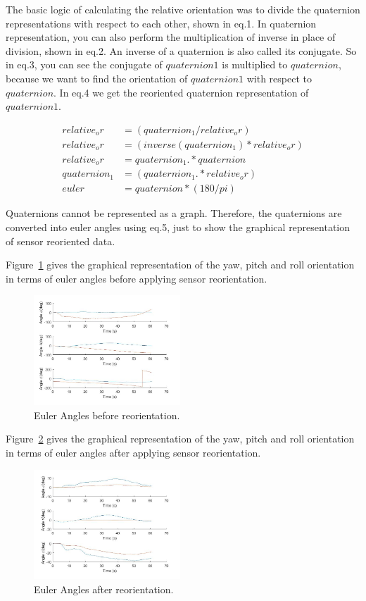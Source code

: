 \documentclass[journal]{IEEEtranTIE}
\begin{document}
The basic logic of calculating the relative orientation was to divide the
quaternion representations with respect to each other, shown in eq.1. In
quaternion representation, you can also perform the multiplication of inverse in
place of division, shown in eq.2. An inverse of a quaternion is also called its
conjugate. So in eq.3, you can see the conjugate of $quaternion1$ is multiplied
to $quaternion$, because we want to find the orientation of $quaternion1$ with
respect to $quaternion$. In eq.4 we get the reoriented quaternion representation
of $quaternion1$.

\begin{align}
  relative_or    &= (quaternion_1 / relative_or)\\
    relative_or  &= (inverse(quaternion_1) * relative_or)\\
  relative_or    &= quaternion_1.* quaternion\\
    quaternion_1 &= (quaternion_1.* relative_or)\\
    euler        &= quaternion*(180/pi)
\end{align}

Quaternions cannot be represented as a graph. Therefore, the quaternions are
converted into euler angles using eq.5, just to show the graphical
representation of sensor reoriented data.

Figure~\ref{fig:nonoriented} gives the graphical representation of the yaw,
pitch and roll orientation in terms of euler angles before applying sensor
reorientation.

\begin{figure}[!t]\centering
  \includegraphics[width=5.5cm]{nonoriented}
  \caption{Euler Angles before reorientation.}\label{fig:nonoriented}
\end{figure}

Figure~\ref{fig:oriented} gives the graphical representation of the yaw, pitch
and roll orientation in terms of euler angles after applying sensor
reorientation.

\begin{figure}[!t]\centering
  \includegraphics[width=5.5cm]{oriented}
  \caption{Euler Angles after reorientation.}\label{fig:oriented}
\end{figure}
\end{document}
